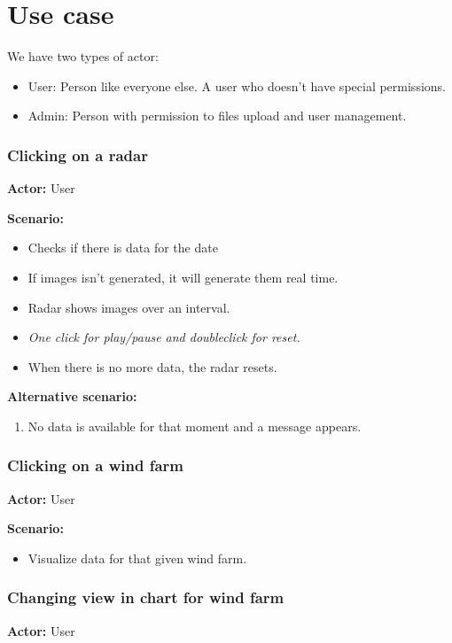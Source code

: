 \chapter{Use case}
We have two types of actor:
\begin{itemize}
\item User: Person like everyone else. A user who doesn't have special permissions.
\item Admin: Person with permission to files upload and user management.
\end{itemize}

\subsection{Clicking on a radar}
\textbf{Actor:} User

\textbf{Scenario:}
\begin{itemize}
\item Checks if there is data for the date
\item If images isn't generated, it will generate them real time.
\item Radar shows images over an interval.
\item \emph{One click for play/pause and doubleclick for reset.}
\item When there is no more data, the radar resets.
\end{itemize}
\textbf{Alternative scenario:} 
\begin{enumerate}
\item No data is available for that moment and a message appears.
\end{enumerate}

\subsection{Clicking on a wind farm}
\textbf{Actor:} User

\textbf{Scenario:}
\begin{itemize}
\item Visualize data for that given wind farm.
\end{itemize}

\subsection{Changing view in chart for wind farm}
\textbf{Actor:} User

